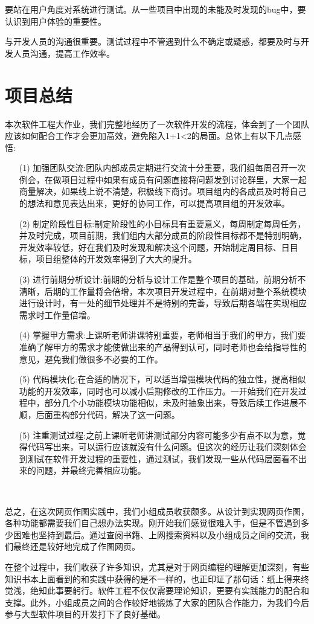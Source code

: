 \documentclass[lang=cn]{elegantpaper}
\begin{document}
要站在用户角度对系统进行测试。从一些项目中出现的未能及时发现的bug中，要认识到用户体验的重要性。

与开发人员的沟通很重要。测试过程中不管遇到什么不确定或疑惑，都要及时与开发人员沟通，提高工作效率。

\section{项目总结}
本次软件工程大作业，我们完整地经历了一次软件开发的流程，体会到了一个团队应该如何配合工作才会更加高效，避免陷入1+1<2的局面。总体上有以下几点感悟:
\begin{itemize}
	\item [(1)]加强团队交流:团队内部成员定期进行交流十分重要，我们组每周召开一次例会，在做项目过程中如果有成员有问题直接将问题发到讨论群里，大家一起商量解决，如果线上说不清楚，积极线下商讨。项目组内的各成员及时将自己的想法和意见表达出来，更好的协同工作，可以提高项目组的开发效率。
	\item [(2)]制定阶段性目标:制定阶段性的小目标具有重要意义，每周制定每周任务，并及时完成，项目前期，我们组内大部分成员的阶段性目标都不是特别明确，开发效率较低，好在我们及时发现和解决这个问题，开始制定周目标、日目标，项目组整体的开发效率得到了大大的提升。
	\item [(3)]进行前期分析设计:前期的分析与设计工作是整个项目的基础，前期分析不清晰，后期的工作量将会倍增，本次项目开发过程中，在前期对整个系统模块进行设计时，有一处的细节处理并不是特别的完善，导致后期各端在实现相应需求时工作量倍增。
	\item [(4)]掌握甲方需求:上课听老师讲课特别重要，老师相当于我们的甲方，我们要准确了解甲方的需求才能使做出来的产品得到认可，同时老师也会给指导性的意见，避免我们做很多不必要的工作。
	\item [(5)]代码模块化:在合适的情况下，可以适当增强模块代码的独立性，提高相似功能的开发效率，同时也可以减小后期修改的工作压力。一开始我们在开发过程中，部分几个小功能模块功能相似，未及时抽象出来，导致后续工作进展不顺，后面重构部分代码，解决了这一问题。
	\item [(5)]注重测试过程:之前上课听老师讲测试部分内容可能多少有点不以为意，觉得代码写出来，可以运行应该就没有什么问题。但这次的经历让我们深刻体会到测试在软件开发过程的重要性，通过测试，我们发现一些从代码层面看不出来的问题，并最终完善相应功能。
\end{itemize}　

总之，在这次网页作图实践中，我们小组成员收获颇多。从设计到实现网页作图，各种功能都需要我们自己想办法实现。刚开始我们感觉很难入手，但是不管遇到多少困难也坚持到最后。通过查阅书籍、上网搜索资料以及小组成员之间的交流，我们最终还是较好地完成了作图网页。

在整个过程中，我们收获了许多知识，尤其是对于网页编程的理解更加深刻，有些知识书本上面看到的和实践中获得的是不一样的，也正印证了那句话：纸上得来终觉浅，绝知此事要躬行。软件工程不仅仅需要理论知识，更要有实践能力的配合和支撑。此外，小组成员之间的合作较好地锻炼了大家的团队合作能力，为我们今后参与大型软件项目的开发打下了良好基础。
















% 
% 
\end{document}
